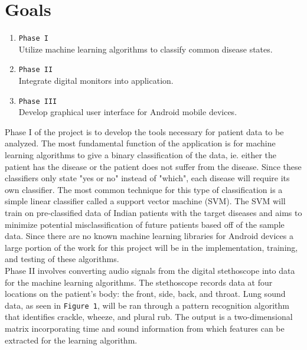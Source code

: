\documentclass{article}
\begin{document}
\section{Goals}
\begin{enumerate}
\item[] \texttt{Phase I}\\ Utilize machine learning algorithms to classify common disease states.
\item[] \texttt{Phase II} \\ Integrate digital monitors into application.
\item[] \texttt{Phase III} \\ Develop graphical user interface for Android mobile devices.
\end{enumerate}

Phase I of the project is to develop the tools necessary for patient data to be analyzed. The most fundamental function of the application is for machine learning algorithms to give a binary classification of the data, ie. either the patient has the disease or the patient does not suffer from the disease. Since these classifiers only state "yes or no" instead of "which", each disease will require its own classifier. The most common technique for this type of classification is a simple linear classifier called a support vector machine (SVM). The SVM will train on pre-classified data of Indian patients with the target diseases and aims to minimize potential misclassification of future patients based off of the sample data. Since there are no known machine learning libraries for Android devices a large portion of the work for this project will be in the implementation, training, and testing of these algorithms. \\

Phase II involves converting audio signals from the digital stethoscope into data for the machine learning algorithms. The stethoscope records data at four locations on the patient's body: the front, side, back, and throat. Lung sound data, as seen in \texttt{Figure 1}, will be ran through a pattern recognition algorithm that identifies crackle, wheeze, and plural rub. The output is a two-dimensional matrix incorporating time and sound information from which features can be extracted for the learning algorithm.\\

\end{document}
